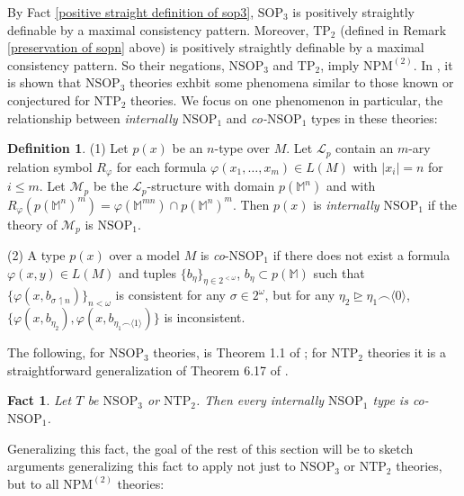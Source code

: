 \documentclass{article}
\newtheorem{fact}{Fact}
\theoremstyle{definition}
\newtheorem{definition}{Definition}
\theoremstyle{definition}
\theoremstyle{definition}
\begin{document}
By Fact \ref{positive straight definition of sop3}, $\mathrm{SOP}_{3}$ is positively straightly definable by a maximal consistency pattern.  Moreover, $\mathrm{TP}_{2}$ (defined in Remark \ref{preservation of sopn} above) is positively straightly definable by a maximal consistency pattern. So their negations, $\mathrm{NSOP}_{3}$ and $\mathrm{TP}_{2}$, imply $\mathrm{NPM}^{(2)}$. In \cite{mutchnik2023properties}, it is shown that $\mathrm{NSOP}_{3}$ theories exhbit some phenomena similar to those known or conjectured for $\mathrm{NTP}_{2}$ theories. We focus on one phenomenon in particular, the relationship between \textit{internally $\mathrm{NSOP}_{1}$} and \textit{co-$\mathrm{NSOP}_{1}$} types in these theories:

\begin{definition}
    (1) Let $p(x)$ be an $n$-type over $M$. Let $\mathcal{L}_{p}$ contain an $m$-ary relation symbol $R_{\varphi}$ for each formula $\varphi(x_{1}, \ldots, x_{m}) \in L(M)$ with $|x_{i}| = n$ for $i \leq m$. Let $\mathcal{M}_{p}$ be the $\mathcal{L}_{p}$-structure with domain $p(\mathbb{M}^{n})$ and with $R_{\varphi}(p(\mathbb{M}^{n})^{m}) = \varphi(\mathbb{M}^{mn}) \cap p(\mathbb{M}^{n})^{m}$. Then $p(x)$ is \textit{internally $\mathrm{NSOP}_{1}$} if the theory of $\mathcal{M}_{p}$ is $\mathrm{NSOP}_{1}$.

    (2) A type $p(x)$ over a model $M$ is \textit{co}-$\mathrm{NSOP}_{1}$ if there does not exist a formula $\varphi(x, y) \in L(M)$ and tuples $\{b_{\eta}\}_{\eta \in 2^{<\omega}}$, $b_{\eta} \subset p(\mathbb{M})$ such that $\{\varphi(x, b_{\sigma \upharpoonleft n})\}_{n < \omega}$ is consistent for any $\sigma \in 2^{\omega}$, but for any $\eta_{2} \unrhd \eta_{1} \smallfrown \langle 0\rangle$, $\{\varphi(x, b_{\eta_{2}}), \varphi(x, b_{\eta_{1} \smallfrown \langle 1\rangle})\}$ is inconsistent.
\end{definition}

The following, for $\mathrm{NSOP}_{3}$ theories, is Theorem 1.1 of \cite{mutchnik2023properties}; for $\mathrm{NTP}_{2}$ theories it is a straightforward generalization of Theorem 6.17 of \cite{chernikov2014theories}.

\begin{fact}
    Let $T$ be $\mathrm{NSOP}_{3}$ or $\mathrm{NTP}_{2}$. Then every internally $\mathrm{NSOP}_{1}$ type is co-$\mathrm{NSOP}_{1}$.
\end{fact}


Generalizing this fact, the goal of the rest of this section will be to sketch arguments generalizing this fact to apply not just to $\mathrm{NSOP}_{3}$ or $\mathrm{NTP}_{2}$ theories, but to all $\mathrm{NPM}^{(2)}$ theories:
\end{document}
